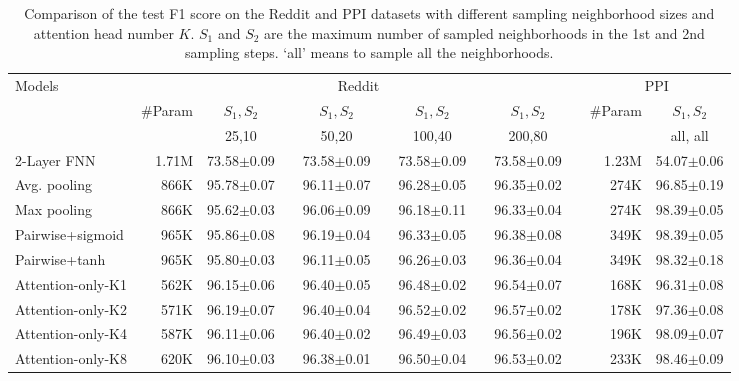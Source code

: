 \documentclass{article}
\begin{document}
	\begin{table*}[!ht]
		\centering
		\caption{Comparison of the test F1 score on the Reddit and PPI datasets with different sampling neighborhood sizes and attention head number $K$. $S_1$ and $S_2$ are the maximum number of sampled neighborhoods in the 1st and 2nd sampling steps. `all' means to sample all the neighborhoods.}
		\begin{tabular}{l |r m{1.2cm}p{0.01cm} m{1.2cm}p{0.01cm} m{1.2cm}p{0.01cm} m{1.2cm}p{0.01cm} | r c }
			\hline
			\multirow{3}{*}{Models} &  \multicolumn{9}{c}{Reddit} &\multicolumn{2}{c}{PPI} \\
			& \multirow{2}{*}{\#Param}  & \multicolumn{1}{c}{$S_1,S_2$} & & \multicolumn{1}{c}{$S_1,S_2$} & & \multicolumn{1}{c}{$S_1,S_2$} & & \multicolumn{1}{c}{$S_1,S_2$} & & \multirow{2}{*}{\#Param}  & \multicolumn{1}{c}{$S_1, S_2$} \\
			\cline{3-3}  \cline{5-5} \cline{7-7} \cline{9-9} \cline{12-12}
			&  &  \multicolumn{1}{c}{25,10}  && \multicolumn{1}{c}{50,20}   && \multicolumn{1}{c}{100,40}   && \multicolumn{1}{c}{200,80} && & all, all \\
			\hline \hline
			2-Layer FNN & 1.71M  & 73.58$\pm$0.09  && 73.58$\pm$0.09 && 73.58$\pm$0.09 && 73.58$\pm$0.09 && 1.23M & 54.07$\pm$0.06\\ 
			Avg. pooling      & 866K & 95.78$\pm$0.07  && 96.11$\pm$0.07 && 96.28$\pm$0.05 && 96.35$\pm$0.02 && 274K & 96.85$\pm$0.19 \\ 
			Max pooling      & 866K & 95.62$\pm$0.03  && 96.06$\pm$0.09 && 96.18$\pm$0.11 && 96.33$\pm$0.04 && 274K & 98.39$\pm$0.05 \\
			Pairwise+sigmoid      & 965K & 95.86$\pm$0.08  && 96.19$\pm$0.04 && 96.33$\pm$0.05 && 96.38$\pm$0.08 && 349K & 98.39$\pm$0.05  \\
			Pairwise+tanh      & 965K & 95.80$\pm$0.03  && 96.11$\pm$0.05 && 96.26$\pm$0.03 && 96.36$\pm$0.04 && 349K & 98.32$\pm$0.18  \\  \hline\hline
			Attention-only-K1  & 562K & 96.15$\pm$0.06  && 96.40$\pm$0.05 && 96.48$\pm$0.02 && 96.54$\pm$0.07 && 168K & 96.31$\pm$0.08  \\
			Attention-only-K2    & 571K & 96.19$\pm$0.07  && 96.40$\pm$0.04 && 96.52$\pm$0.02 && 96.57$\pm$0.02 && 178K & 97.36$\pm$0.08  \\
			Attention-only-K4    & 587K & 96.11$\pm$0.06  && 96.40$\pm$0.02 && 96.49$\pm$0.03 && 96.56$\pm$0.02 && 196K & 98.09$\pm$0.07  \\
			Attention-only-K8    & 620K & 96.10$\pm$0.03  && 96.38$\pm$0.01 && 96.50$\pm$0.04 && 96.53$\pm$0.02 && 233K & 98.46$\pm$0.09  \\ \hline

\end{tabular}
\end{table*}
\end{document}
